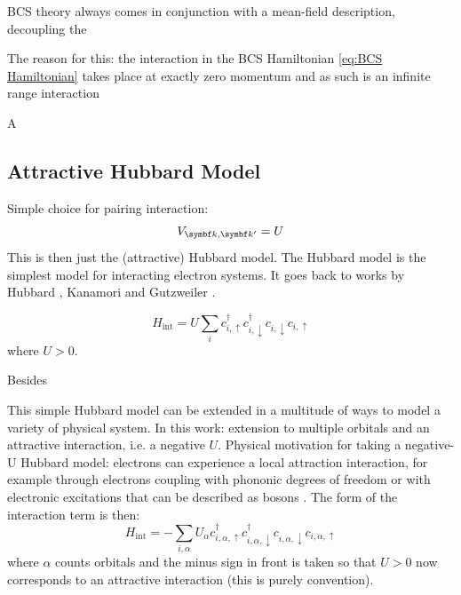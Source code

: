 \documentclass[../notes.tex]{subfiles}
\begin{document}

BCS theory always comes in conjunction with a mean-field description, decoupling the 


The reason for this: the interaction in the BCS Hamiltonian \cref{eq:BCS Hamiltonian} takes place at exactly zero momentum and as such is an infinite range interaction

A 



\subsection{Attractive Hubbard Model}

Simple choice for pairing interaction:
\begin{equation}
	V_{\vb{k}, \vb{k}^{\prime}} = U
\end{equation}
This is then just the (attractive) Hubbard model.
The Hubbard model is the simplest model for interacting electron systems.
It goes back to works by Hubbard \cite{hubbardElectronCorrelationsNarrow1963}, Kanamori \cite{kanamoriElectronCorrelationFerromagnetism1963} and Gutzweiler \cite{gutzwillerEffectCorrelationFerromagnetism1963}.

\begin{equation}
	H_{\mathrm{int}} = U \sum_{i} c_{i, \uparrow}^{\dagger} c_{i, \downarrow}^{\dagger} c_{i, \downarrow} c_{i, \uparrow}
\end{equation}
where \(U > 0\).



Besides 

\cite{qinHubbardModelComputational2022}

This simple Hubbard model can be extended in a multitude of ways to model a variety of physical system.
In this work: extension to multiple orbitals and an attractive interaction, i.e. a negative \(U\).
Physical motivation for taking a negative-U Hubbard model: electrons can experience a local attraction interaction, for example through electrons coupling with phononic degrees of freedom or with electronic excitations that can be described as bosons \cite{micnasSuperconductivityNarrowbandSystems1990}.
The form of the interaction term is then:
\begin{equation}
	H_{\mathrm{int}} = -\sum_{i, \alpha} U_{\alpha} c_{i, \alpha, \uparrow}^{\dagger} c_{i, \alpha, \downarrow}^{\dagger} c_{i, \alpha, \downarrow} c_{i, \alpha, \uparrow}
	\label{eq:Hubbard interaction multiband}
\end{equation}
where \(\alpha\) counts orbitals and the minus sign in front is taken so that \(U > 0\) now corresponds to an attractive interaction (this is purely convention).
\end{document}
